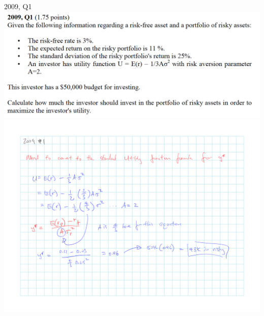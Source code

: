 \documentclass[]{book}
\theoremstyle{definition}
\theoremstyle{definition}
\theoremstyle{remark}
\begin{document}
 2009, Q1 \includegraphics{questions/2009-1Q.png}
\includegraphics{questions/2009-1A.png}
\end{document}
